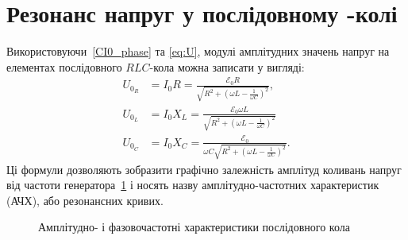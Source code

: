 
\section{Резонанс напруг у послідовному -колі}

Використовуючи~\eqref{CI0_phase} та \eqref{eq:U}, модулі амплітудних значень напруг на елементах послідовного $RLC$-кола можна записати у вигляді:
\begin{align}
	U_{0_R} & = I_0R =   \frac{\mathcal{E}_0 R}{\sqrt{R^2  +   \left(  \omega L - \frac{1}{\omega C} \right)^2}}, \label{U0R}       \\
	U_{0_L} & = I_0X_L = \frac{\mathcal{E}_0 \omega L}{\sqrt{R^2  +   \left(  \omega L - \frac{1}{\omega C} \right)^2}} \label{U0L} \\
	U_{0_C} & = I_0X_C = \frac{\mathcal{E}_0}{\omega C\sqrt{R^2  +   \left(  \omega L - \frac{1}{\omega C} \right)^2}}\label{U0C}.
\end{align}
Ці формули дозволяють зобразити графічно залежність амплітуд коливань напруг  від частоти генератора~\ref{plt:S-AFC} і носять назву амплітудно-частотних характеристик (АЧХ), або резонансних кривих. 

\begin{figure}[!h]\centering
	\begin{minipage}{0.75\linewidth}
		
		\caption{Амплітудно- і фазовочастотні характеристики послідовного кола}
		\label{plt:S-AFC}
	\end{minipage}
\end{figure}


%    

